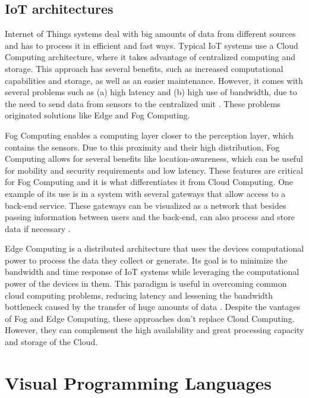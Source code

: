 \subsection{IoT architectures}\label{sec:architectures}

Internet of Things systems deal with big amounts of data from different sources and has to process it in efficient and fast ways. Typical IoT systems use a Cloud Computing architecture, where it takes advantage of centralized computing and storage. This approach has several benefits, such as increased computational capabilities and storage, as well as an easier maintenance. However, it comes with several problems such as (a) high latency and (b) high use of bandwidth, due to the need to send data from sensors to the centralized unit \cite{connecting_fog_and_cloud}. These problems originated solutions like Edge and Fog Computing.
\par Fog Computing enables a computing layer closer to the perception layer, which contains the sensors. Due to this proximity and their high distribution, Fog Computing allows for several benefits like location-awareness, which can be useful for mobility and security requirements and low latency. These features are critical for Fog Computing and it is what differentiates it from Cloud Computing. One example of its use is in a system with several gateways that allow access to a back-end service. These gateways can be visualized as a network that besides passing information between users and the back-end, can also process and store data if necessary \cite{fog_computing_book}. 
\par Edge Computing is a distributed architecture that uses the devices computational power to process the data they collect or generate. Its goal is to minimize the bandwidth and time response of IoT systems while leveraging the computational power of the devices in them. This paradigm is useful in overcoming common cloud computing problems, reducing latency and lessening the bandwidth bottleneck caused by the transfer of huge amounts of data \cite{edge_computing}. 
Despite the vantages of Fog and Edge Computing, these approaches don't replace Cloud Computing. However, they can complement the high availability and great processing capacity and storage of the Cloud.

\section{Visual Programming Languages}\label{sec:background_vpl}

